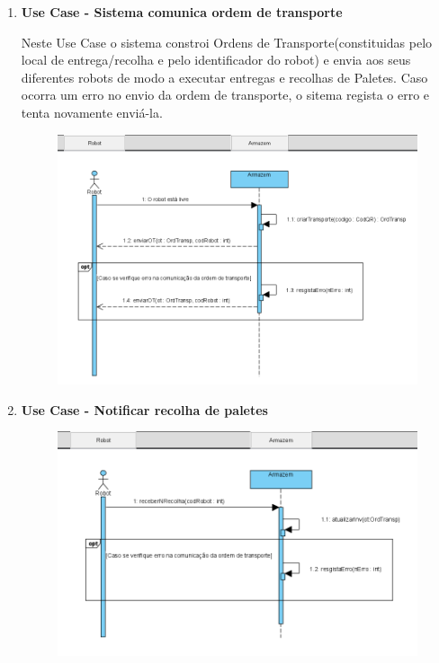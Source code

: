 \documentclass[a4paper]{report}
\begin{document}
\begin{enumerate}
        \item \textbf{Use Case - Sistema comunica ordem de transporte}
            
            Neste Use Case o sistema constroi Ordens de Transporte(constituidas pelo local de entrega/recolha e pelo identificador do robot) e envia aos seus diferentes robots de modo a executar entregas e recolhas de Paletes. Caso ocorra um erro no envio da ordem de transporte, o sitema regista o erro e tenta novamente enviá-la.
            
            \begin{figure}[H]
             \centering
             \includegraphics[scale=0.50]{images/UC-ComunicaOT.PNG}
             \caption{}
            \end{figure}
        
        \pagebreak
        \item \textbf{Use Case - Notificar recolha de paletes}
            
            \begin{figure}[H]
             \centering
             \includegraphics[scale=0.50]{images/UC-NRecolha.PNG}
             \caption{}
            \end{figure}
        

\end{enumerate}
\end{document}
